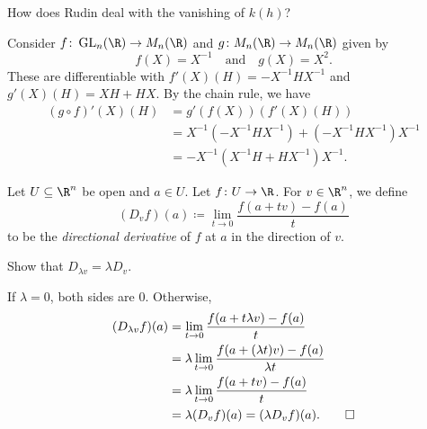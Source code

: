 How does Rudin deal with the vanishing of $k(h)$?
\begin{examples}
    \item Consider $f\colon \GL_n(\R) \to M_n(\R)$ and
    $g\colon M_n(\R) \to M_n(\R)$ given by \[
        f(X) = X^{-1} \quad \text{and} \quad g(X) = X^2.
    \] These are differentiable with $f'(X)(H) = -X^{-1}HX^{-1}$ and
    $g'(X)(H) = XH + HX$.
    By the chain rule, we have \begin{align*}
        (g \circ f)'(X)(H) &= g'(f(X))(f'(X)(H)) \\
        &= X^{-1}(-X^{-1}HX^{-1}) + (-X^{-1}HX^{-1})X^{-1} \\
        &= -X^{-1}(X^{-1}H + HX^{-1})X^{-1}.
    \end{align*} 
\end{examples}

\begin{definition} \label{def:dv}
    Let $U \subseteq \R^n$ be open and $a \in U$.
    Let $f\colon U \to \R$.
    For $v \in \R^n$, we define \[
        (D_v f)(a) \coloneq \lim_{t \to 0} \frac{f(a + tv) - f(a)}{t}
    \] to be the \emph{directional derivative} of $f$ at $a$
    in the direction of $v$.
\end{definition}

\begin{exercise}
    Show that $D_{\lambda v} = \lambda D_v$.
\end{exercise}
\begin{solution}
    If $\lambda = 0$, both sides are $0$.
    Otherwise, \begin{align*}
        (D_{\lambda v} f)(a)
            &= \lim_{t \to 0} \frac{f(a + t\lambda v) - f(a)}{t} \\
            &= \lambda \lim_{t \to 0} \frac{f(a + (\lambda t)v) - f(a)}
                                    {\lambda t} \\
            &= \lambda \lim_{t \to 0} \frac{f(a + tv) - f(a)}{t} \\
            &= \lambda (D_v f)(a) = (\lambda D_v f)(a). \qedhere
    \end{align*}
\end{solution}

